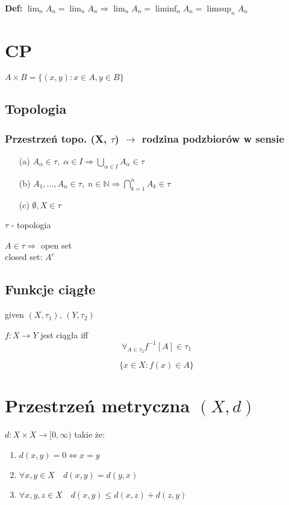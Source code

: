 \documentclass{article}
\begin{document}
\textbf{Def:} $\lim_{n} A_n = \lim_{n} A_n \Rightarrow \lim_{n} A_n = \liminf_{n} A_n = \limsup_{n} A_n$

\section{CP}
$A \times B = \{(x,y): x \in A, y \in B \}$

\subsection{Topologia}
\subsubsection{Przestrzeń topo. (X, $\tau$) $\rightarrow$ rodzina podzbiorów w sensie}
\begin{itemize}
\item[(a)] $A_\alpha \in \tau, \; \alpha \in I \Rightarrow \bigcup_{\alpha \in I} A_\alpha \in \tau$
\item[(b)] $A_1, \ldots, A_n \in \tau, \; n \in \mathbb{N} \Rightarrow \bigcap_{k=1}^n A_k \in \tau$
\item[(c)] $\emptyset, X \in \tau$
\end{itemize}

$\tau$ - topologia

$A \in \tau \Rightarrow$ open set\\
closed set: $A^c$

\subsection{Funkcje ciągłe}
given $(X, \tau_1)$, $(Y, \tau_2)$

$f: X \to Y$ jest ciągła iff 
$$\forall_{A \in \tau_2} f^{-1}[A] \in \tau_1$$

$$\{x \in X: f(x) \in A\}$$

\section{Przestrzeń metryczna $(X, d)$}
$d: X \times X \to [0,\infty)$ takie że:

\begin{enumerate}
\item $d(x,y) = 0 \Leftrightarrow x = y$
\item $\forall x, y \in X \quad d(x,y) = d(y,x)$
\item $\forall x, y, z \in X \quad d(x,y) \leq d(x,z) + d(z,y)$
\end{enumerate}
\end{document}
